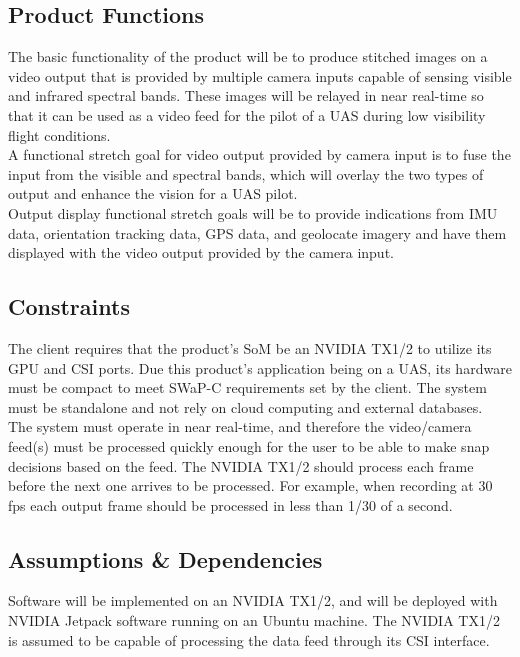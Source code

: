 \documentclass[letterpaper,10pt,serif,draftclsnofoot,onecolumn,compsoc,titlepage]{IEEEtran}
\begin{document}
\subsection{Product Functions}

The basic functionality of the product will be to produce stitched images on a video 
output that is provided by multiple camera inputs capable of sensing visible and 
infrared spectral bands. These images will be relayed in near real-time so that it 
can be used as a video feed for the pilot of a UAS during low visibility flight 
conditions. \\

A functional stretch goal for video output provided by camera input is to fuse the 
input from the visible and spectral bands, which will overlay the two types of output 
and enhance the vision for a UAS pilot. \\

Output display functional stretch goals will be to provide indications from IMU data, 
orientation tracking data, GPS data, and geolocate imagery and have them displayed 
with the video output provided by the camera input. \\

\subsection{Constraints}

The client requires that the product's SoM be an NVIDIA TX1/2 to utilize its GPU 
and CSI ports. Due this product's application being on a UAS, its hardware must be 
compact to meet SWaP-C requirements set by the client. The system must be standalone 
and not rely on cloud computing and external databases. \\

The system must operate in near real-time, and therefore the video/camera feed(s) must be 
processed quickly enough for the user to be able to make snap decisions based on the feed. The 
NVIDIA TX1/2 should process each frame before the next one arrives to be processed. 
For example, when recording at 30 fps each output frame should be processed in 
less than 1/30 of a second.\\

\subsection{Assumptions \& Dependencies}

Software will be implemented on an NVIDIA TX1/2, and will be deployed with NVIDIA 
Jetpack software running on an Ubuntu machine. The NVIDIA TX1/2 is assumed to be 
capable of processing the data feed through its CSI interface. \\
\end{document}
